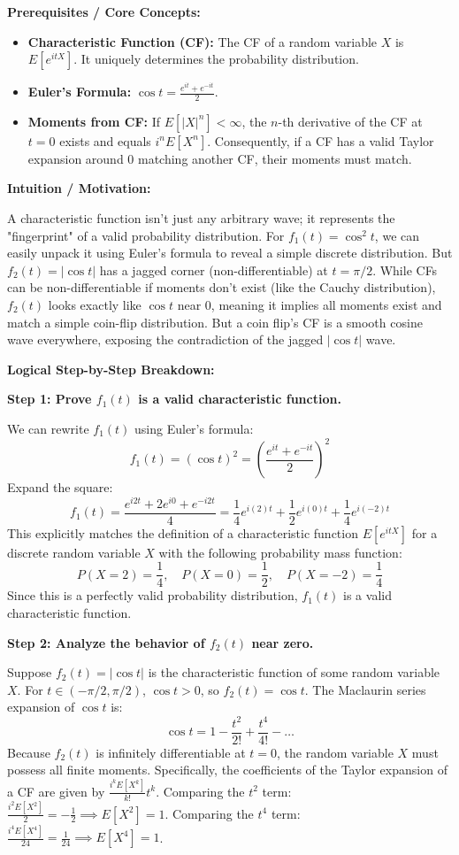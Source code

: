 \begin{solution}
\textbf{Prerequisites / Core Concepts:}
\begin{itemize}
    \item \textbf{Characteristic Function (CF):} The CF of a random variable $X$ is $E[e^{itX}]$. It uniquely determines the probability distribution.
    \item \textbf{Euler's Formula:} $\cos t = \frac{e^{it} + e^{-it}}{2}$.
    \item \textbf{Moments from CF:} If $E[|X|^n] < \infty$, the $n$-th derivative of the CF at $t=0$ exists and equals $i^n E[X^n]$. Consequently, if a CF has a valid Taylor expansion around 0 matching another CF, their moments must match.
\end{itemize}

\textbf{Intuition / Motivation:}

A characteristic function isn't just any arbitrary wave; it represents the "fingerprint" of a valid probability distribution. For $f_1(t) = \cos^2 t$, we can easily unpack it using Euler's formula to reveal a simple discrete distribution. But $f_2(t) = |\cos t|$ has a jagged corner (non-differentiable) at $t = \pi/2$. While CFs can be non-differentiable if moments don't exist (like the Cauchy distribution), $f_2(t)$ looks exactly like $\cos t$ near 0, meaning it implies all moments exist and match a simple coin-flip distribution. But a coin flip's CF is a smooth cosine wave everywhere, exposing the contradiction of the jagged $|\cos t|$ wave.

\textbf{Logical Step-by-Step Breakdown:}

\textbf{Step 1: Prove $f_1(t)$ is a valid characteristic function.}

We can rewrite $f_1(t)$ using Euler's formula:
\[ f_1(t) = (\cos t)^2 = \left( \frac{e^{it} + e^{-it}}{2} \right)^2 \]
Expand the square:
\[ f_1(t) = \frac{e^{i2t} + 2e^{i0} + e^{-i2t}}{4} = \frac{1}{4}e^{i(2)t} + \frac{1}{2}e^{i(0)t} + \frac{1}{4}e^{i(-2)t} \]
This explicitly matches the definition of a characteristic function $E[e^{itX}]$ for a discrete random variable $X$ with the following probability mass function:
\[ P(X = 2) = \frac{1}{4}, \quad P(X = 0) = \frac{1}{2}, \quad P(X = -2) = \frac{1}{4} \]
Since this is a perfectly valid probability distribution, $f_1(t)$ is a valid characteristic function.

\textbf{Step 2: Analyze the behavior of $f_2(t)$ near zero.}

Suppose $f_2(t) = |\cos t|$ is the characteristic function of some random variable $X$.
For $t \in (-\pi/2, \pi/2)$, $\cos t > 0$, so $f_2(t) = \cos t$.
The Maclaurin series expansion of $\cos t$ is:
\[ \cos t = 1 - \frac{t^2}{2!} + \frac{t^4}{4!} - \dots \]
Because $f_2(t)$ is infinitely differentiable at $t=0$, the random variable $X$ must possess all finite moments.
Specifically, the coefficients of the Taylor expansion of a CF are given by $\frac{i^k E[X^k]}{k!} t^k$.
Comparing the $t^2$ term: $\frac{i^2 E[X^2]}{2} = -\frac{1}{2} \implies E[X^2] = 1$.
Comparing the $t^4$ term: $\frac{i^4 E[X^4]}{24} = \frac{1}{24} \implies E[X^4] = 1$.


\end{solution}
